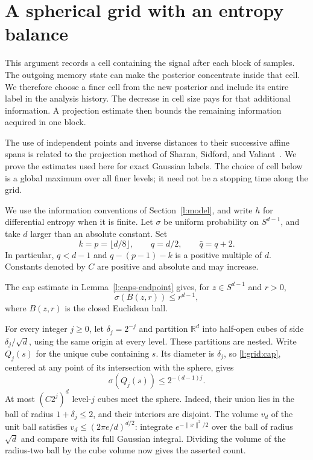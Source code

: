 \section{A spherical grid with an entropy balance}
\label{l:grid:section}

This argument records a cell containing the signal after each block of
samples.  The outgoing memory state can make the posterior concentrate
inside that cell.  We therefore choose a finer cell from the new posterior
and include its entire label in the analysis history.  The decrease in
cell size pays for that additional information.  A projection estimate
then bounds the remaining information acquired in one block.

The use of independent points and inverse distances to their successive
affine spans is related to the projection method of Sharan, Sidford, and
Valiant~\cite[Section~7, Lemma~12]{SSV2019}.  We prove the estimates used
here for exact Gaussian labels.  The choice of cell below is a global
maximum over all finer levels; it need not be a stopping time along the
grid.

We use the information conventions of Section~\ref{l:model}, and write
$h$ for differential entropy when it is finite.  Let $\sigma$ be uniform
probability on $S^{d-1}$, and take $d$ larger than an absolute constant.  Set
\begin{equation}\label{l:grid:parameters}
 k=p=\lfloor d/8\rfloor,\qquad q=d/2,\qquad \bar q=q+2.
\end{equation}
In particular, $q<d-1$ and $q-(p-1)-k$ is a positive multiple of $d$.
Constants denoted by $C$ are positive and absolute and may increase.

The cap estimate in Lemma~\ref{l:caps-endpoint} gives, for
$z\in S^{d-1}$ and $r>0$,
\begin{equation}\label{l:grid:cap}
 \sigma(B(z,r))\le r^{d-1},
\end{equation}
where $B(z,r)$ is the closed Euclidean ball.

For every integer $j\ge0$, let $\delta_j=2^{-j}$ and partition
$\mathbb R^d$ into half-open cubes of side $\delta_j/\sqrt d$, using
the same origin at every level.  These partitions are nested.  Write
$Q_j(s)$ for the unique cube containing $s$.  Its diameter is
$\delta_j$, so \eqref{l:grid:cap}, centered at any point of its
intersection with the sphere, gives
\begin{equation}\label{l:grid:cell-mass}
 \sigma(Q_j(s))\le 2^{-(d-1)j}.
\end{equation}
At most $(C2^j)^d$ level-$j$ cubes meet the sphere.  Indeed, their union
lies in the ball of radius $1+\delta_j\le2$, and their interiors are
disjoint.  The volume $v_d$ of the unit ball satisfies
$v_d\le(2\pi e/d)^{d/2}$: integrate $e^{-\|x\|^2/2}$ over the ball
of radius $\sqrt d$ and compare with its full Gaussian integral.
Dividing the volume of the radius-two ball by the cube volume now gives
the asserted count.

